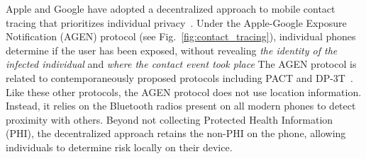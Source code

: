 






Apple and Google have adopted a decentralized approach to mobile contact tracing that prioritizes individual privacy~\cite{agen}. Under the Apple-Google Exposure Notification (AGEN) protocol (see Fig.~\ref{fig:contact_tracing}), individual phones determine if the user has been exposed, without revealing \emph{the identity of the infected individual} and \emph{where the contact event took place}
The AGEN protocol is related to contemporaneously proposed protocols including PACT and DP-3T~\cite{pact,dp3t}.
Like these other protocols, the AGEN protocol does not use location information. 
Instead, it relies on the Bluetooth radios present on all modern phones to detect proximity with others. 
Beyond not collecting Protected Health Information (PHI), the decentralized approach retains the non-PHI on the phone, allowing individuals to determine risk locally on their device.

